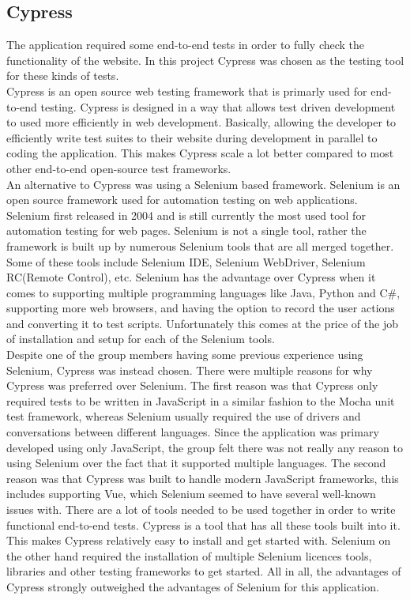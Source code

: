\subsection{Cypress}
The application required some end-to-end tests in order to fully check the functionality of the website. In this project Cypress was chosen as the testing tool for these kinds of tests.
\\[11pt]
Cypress is an open source web testing framework that is primarly used for end-to-end testing. Cypress is designed in a way that allows test driven development to used more efficiently in web development. Basically, allowing the developer to efficiently write test suites to their website during development in parallel to coding the application. This makes Cypress scale a lot better compared to most other end-to-end open-source test frameworks.
\\[11pt]
An alternative to Cypress was using a Selenium based framework. Selenium is an open source framework used for automation testing on web applications. Selenium first released in 2004 and is still currently the most used tool for automation testing for web pages. Selenium is not a single tool, rather the framework is built up by numerous Selenium tools that are all merged together. Some of these tools include Selenium IDE, Selenium WebDriver, Selenium RC(Remote Control), etc. Selenium has the advantage over Cypress when it comes to supporting multiple programming languages like Java, Python and C\#, supporting more web browsers, and having the option to record the user actions and converting it to test scripts. Unfortunately this comes at the price of the job of installation and setup for each of the Selenium tools.\cite{Selenium:Intro,Selenium:Wiki}
\\[11pt]
Despite one of the group members having some previous experience using Selenium, Cypress was instead chosen. There were multiple reasons for why Cypress was preferred over Selenium. The first reason was that Cypress only required tests to be written in JavaScript in a similar fashion to the Mocha unit test framework, whereas Selenium usually required the use of drivers and conversations between different languages. Since the application was primary developed using only JavaScript, the group felt there was not really any reason to using Selenium over the fact that it supported multiple languages. The second reason was that Cypress was built to handle modern JavaScript frameworks, this includes supporting Vue, which Selenium seemed to have several well-known issues with. There are a lot of tools needed to be used together in order to write functional end-to-end tests. Cypress is a tool that has all these tools built into it. This makes Cypress relatively easy to install and get started with. Selenium on the other hand required the installation of multiple Selenium licences tools, libraries and other testing frameworks to get started. All in all, the advantages of Cypress strongly outweighed the advantages of Selenium for this application.
